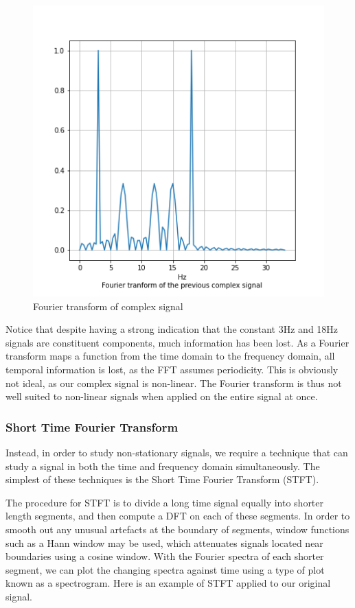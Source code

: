 \documentclass[
  english,
  paper=a4,
  oneside  ,captions=tableheading
]{scrbook}
\begin{document}
\begin{figure}
\centering
\includegraphics{img/fft.png}
\caption{Fourier transform of complex signal}
\end{figure}

Notice that despite having a strong indication that the constant 3Hz and
18Hz signals are constituent components, much information has been lost.
As a Fourier transform maps a function from the time domain to the
frequency domain, all temporal information is lost, as the FFT assumes
periodicity. This is obviously not ideal, as our complex signal is
non-linear. The Fourier transform is thus not well suited to non-linear
signals when applied on the entire signal at once.

\hypertarget{short-time-fourier-transform}{%
\subsubsection{Short Time Fourier
Transform}\label{short-time-fourier-transform}}

Instead, in order to study non-stationary signals, we require a
technique that can study a signal in both the time and frequency domain
simultaneously. The simplest of these techniques is the Short Time
Fourier Transform (STFT).

The procedure for STFT is to divide a long time signal equally into
shorter length segments, and then compute a DFT on each of these
segments. In order to smooth out any unusual artefacts at the boundary
of segments, window functions such as a Hann window may be used, which
attenuates signals located near boundaries using a cosine window. With
the Fourier spectra of each shorter segment, we can plot the changing
spectra against time using a type of plot known as a spectrogram. Here
is an example of STFT applied to our original signal.
\end{document}
